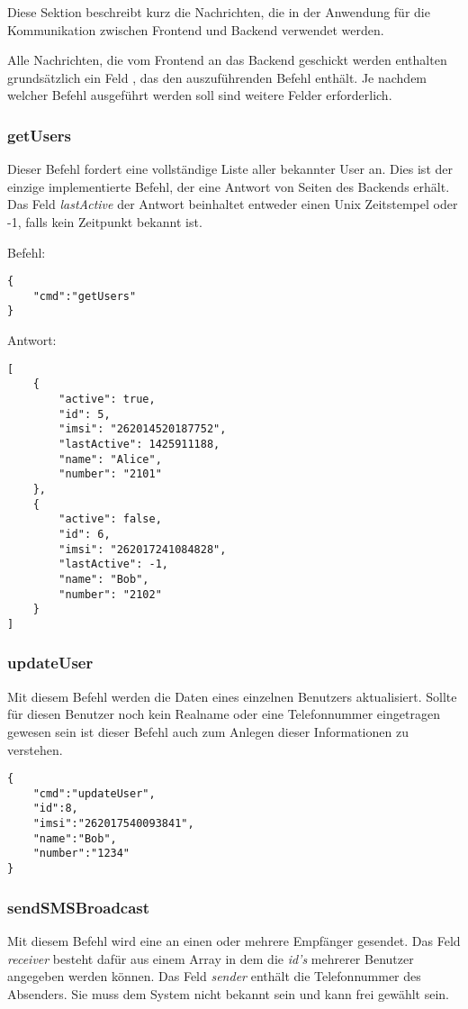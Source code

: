 Diese Sektion beschreibt kurz die \JSON Nachrichten, die in der Anwendung für die Kommunikation zwischen Frontend und Backend verwendet werden.

Alle \JSON Nachrichten, die vom Frontend an das Backend geschickt werden enthalten grundsätzlich ein Feld , das den auszuführenden Befehl enthält. Je nachdem welcher Befehl ausgeführt werden soll sind weitere Felder erforderlich.

\subsubsection*{getUsers}
Dieser Befehl fordert eine vollständige Liste aller bekannter User an. Dies ist der einzige implementierte Befehl, der eine Antwort von Seiten des Backends erhält. Das Feld \textit{lastActive} der Antwort beinhaltet entweder einen Unix Zeitstempel oder -1, falls kein Zeitpunkt bekannt ist.

\textbullet \space Befehl:

\begin{lstlisting}[style=json]
{
	"cmd":"getUsers"
}
\end{lstlisting}

\textbullet \space Antwort:

\begin{lstlisting}[style=json]
[
	{
		"active": true,
		"id": 5,
		"imsi": "262014520187752",
		"lastActive": 1425911188,
		"name": "Alice",
		"number": "2101"
	},
	{
		"active": false,
		"id": 6,
		"imsi": "262017241084828",
		"lastActive": -1,
		"name": "Bob",
		"number": "2102"
	}
]
\end{lstlisting}

\subsubsection*{updateUser}

Mit diesem Befehl werden die Daten eines einzelnen Benutzers aktualisiert. Sollte für diesen Benutzer noch kein Realname oder eine Telefonnummer eingetragen gewesen sein ist dieser Befehl auch zum Anlegen dieser Informationen zu verstehen.

\begin{lstlisting}[style=json]
{
	"cmd":"updateUser",
	"id":8,
	"imsi":"262017540093841",
	"name":"Bob",
	"number":"1234"
}
\end{lstlisting}


\subsubsection*{sendSMSBroadcast}
Mit diesem Befehl wird eine \SMS an einen oder mehrere Empfänger gesendet. Das Feld \textit{receiver} besteht dafür aus einem \JSON Array in dem die \textit{id's} mehrerer Benutzer angegeben werden können. Das Feld \textit{sender} enthält die Telefonnummer des Absenders. Sie muss dem System nicht bekannt sein und kann frei gewählt sein.

